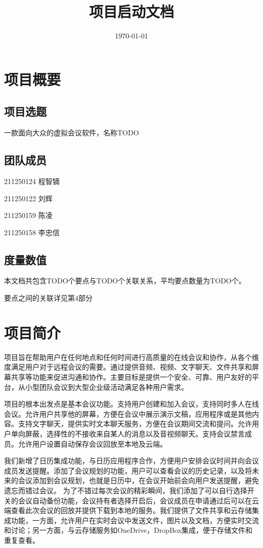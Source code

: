 \documentclass[a4paper,12pt]{article}
\title{项目启动文档}
\date{\today}
\begin{document}
\maketitle

\tableofcontents

\section{项目概要}

\subsection{项目选题}
一款面向大众的虚拟会议软件，名称TODO
\subsection{团队成员}
211250124 程智镝

211250122 刘辉

211250159 陈凌

211250158 李忠信
\subsection{度量数值}
本文档共包含TODO个要点与TODO个关联关系，平均要点数量为TODO个。

要点之间的关联详见第4部分
\tableofcontents
\section{项目简介}
项目旨在帮助用户在任何地点和任何时间进行高质量的在线会议和协作，从各个维度满足用户对于远程会议的需要。通过提供音频、视频、文字聊天、文件共享和屏幕共享等功能来促进沟通和协作。主要目标是提供一个安全、可靠、用户友好的平台，从小型团队会议到大型企业级活动满足各种用户需求。

项目的根本出发点是基本会议功能。支持用户创建和加入会议，支持同时多人在线会议。允许用户共享他的屏幕，方便在会议中展示演示文稿，应用程序或是其他内容。支持文字聊天，提供实时文本聊天服务，方便在会议期间交流和提问。允许用户单向屏蔽，选择性的不接收来自某人的消息以及音视频聊天。支持会议禁言成员。允许用户设置自动保存会议回放至本地及云端。

我们新增了日历集成功能，与日历应用程序合作，方便用户安排会议时间并向会议成员发送提醒。添加了会议规划的功能，用户可以查看会议的历史记录，以及将未来的会议添加到会议规划，也就是日历中，在会议开始前会向用户发送提醒，避免遗忘而错过会议。
为了不错过每次会议的精彩瞬间，我们添加了可以自行选择开关的会议自动备份功能，会议持有者选择开启后，会议成员在申请通过后可以在云端查看此次会议的回放并提供下载到本地的服务。我们提供了文件共享和云存储集成功能，一方面，允许用户在实时会议中发送文件，图片以及文档，方便实时交流和讨论；另一方面，与云存储服务如OneDrive，DropBox集成，便于存储文件和重复查看。
\end{document}
